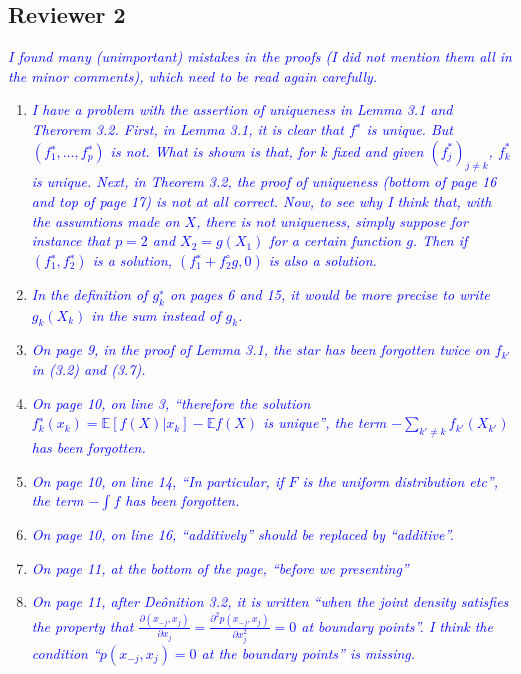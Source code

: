 \documentclass[pdftex,12pt]{article}
\def\E{{\mathbb E}}
\def\reviewercomment#1{{\it\textcolor{blue}{#1}}\smallskip}
\begin{document}
\subsection*{Reviewer 2}

\reviewercomment{I found many (unimportant) mistakes in the proofs (I
  did not mention them all in the minor comments), which need to be
  read again carefully.}

\begin{enumerate}
\item \reviewercomment{I have a problem with the assertion of
  uniqueness in Lemma 3.1 and Therorem 3.2. First, in Lemma 3.1, it is
  clear that $f^∗$ is unique. But $(f_1^∗, \ldots, f_p^∗)$ is not. What is
  shown is that, for $k$ fixed and given $(f_j^*)_{j\neq k}$, $f_k^*$ is unique. Next,
  in Theorem 3.2, the proof of uniqueness (bottom of page 16 and top
  of page 17) is not at all correct.
   Now, to see why I think that, with the assumtions made on $X$, there is
   not uniqueness, simply suppose for instance that $p = 2$ and $X_2 = g(X_1)$
   for a certain function $g$. Then if $(f_1^∗, f_2^∗)$ is a solution,
   $(f_1^∗ + f_2^ \circ g, 0)$ is also a solution.}

\item \reviewercomment{In the definition of $g_k^∗$ on pages 6 and 15, it would be more precise to
write $g_k(X_k)$ in the sum instead of $g_k$.}

\item \reviewercomment{On page 9, in the proof of Lemma 3.1, the star has been forgotten
twice on $f_{k'}$ in (3.2) and (3.7).}

\item \reviewercomment{On page 10, on line 3, ``therefore the solution $f_k^∗(x_k) = \E[f(X)|x_k]
− \E f(X)$ is unique'', the term $−\sum_{k'\neq k} f_{k'}(X_{k'})$ has been forgotten.}

\item \reviewercomment{On page 10, on line 14, ``In particular, if $F$ is the uniform
distribution etc'', the term $− \int f$ has been forgotten.}

\item \reviewercomment{On page 10, on line 16, ``additively'' should be replaced by
``additive''.}

\item \reviewercomment{On page 11, at the bottom of the page, ``before we presenting''}

\item \reviewercomment{On page 11, after Deônition 3.2, it is written ``when the joint
density satisfies the property that
$\frac{\partial(x_{-j},x_j)}{\partial x_j} = \frac{\partial^2 p(x_{-j},
  x_j)}{\partial x_j^2} = 0$ at boundary points''.
I think the condition ``$p(x_{−j}, x_j ) = 0$ at the boundary points'' is
missing.}


\end{enumerate}
\end{document}
